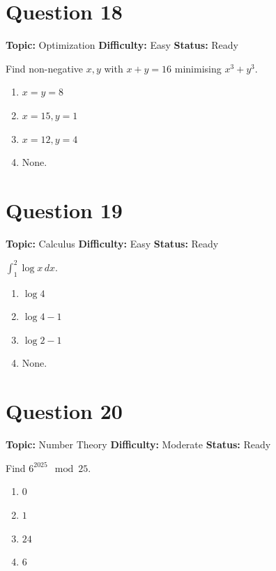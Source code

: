 \documentclass[11pt]{article}
\begin{document}
\section*{Question 18}


\noindent\textbf{Topic:} Optimization \quad \textbf{Difficulty:} Easy \quad \textbf{Status:} Ready



Find non-negative $x,y$ with $x + y = 16$ minimising $x^3 + y^3$.
\begin{enumerate}[label=(\Alph*)]
\item $x=y=8$ \item $x=15,y=1$ \item $x=12,y=4$ \item None.
\end{enumerate}

\newpage

\section*{Question 19}


\noindent\textbf{Topic:} Calculus \quad \textbf{Difficulty:} Easy \quad \textbf{Status:} Ready



$\displaystyle \int_1^2 \log x\, dx$.
\begin{enumerate}[label=(\Alph*)]
\item $\log 4$ \item $\log 4 - 1$ \item $\log 2 - 1$ \item None.
\end{enumerate}

\newpage

\section*{Question 20}


\noindent\textbf{Topic:} Number Theory \quad \textbf{Difficulty:} Moderate \quad \textbf{Status:} Ready



Find $6^{2025} \mod 25$.
\begin{enumerate}[label=(\Alph*)]
\item $0$ \item $1$ \item $24$ \item $6$
\end{enumerate}
\end{document}
